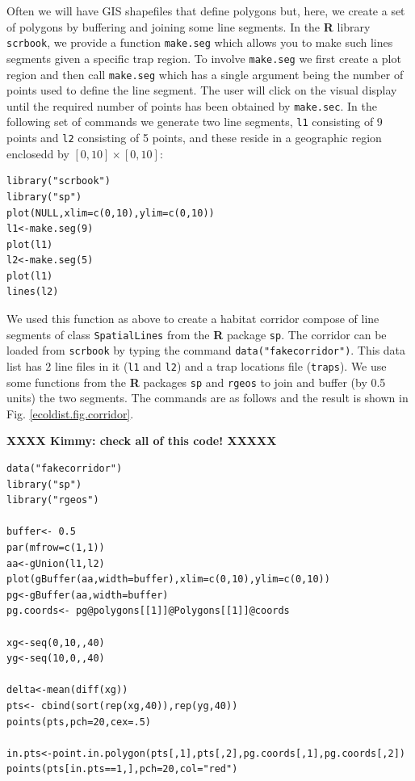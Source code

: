 Often we will have GIS shapefiles that define polygons but, here, we 
 create a set of polygons by
buffering and joining some line segments.
In the {\bf R} library \mbox{\tt scrbook}, we provide
 a function \mbox{\tt make.seg} which allows you to make such
 lines segments given a
specific trap region.  To involve \mbox{\tt make.seg} we first
create a plot region and then call \mbox{\tt make.seg} which has a
single argument being the number of points used to define the line
segment. The user will click on the visual display until the required
number of points has been obtained by \mbox{\tt make.sec}. 
In the following set of commands we generate two line
segments, \mbox{\tt l1} consisting of 9 points and \mbox{\tt l2}
consisting of 5 points, and these reside in a geographic region
enclosedd by $[0,10] \times [0,10]$:
{\small
\begin{verbatim}
library("scrbook")
library("sp")
plot(NULL,xlim=c(0,10),ylim=c(0,10))
l1<-make.seg(9)
plot(l1)
l2<-make.seg(5)
plot(l1)
lines(l2)
\end{verbatim}
}

We used this function as above to create a habitat corridor compose of
line segments of class
\mbox{\tt SpatialLines} from the {\bf R} package \mbox{\tt sp}. The 
corridor can be loaded from \mbox{\tt scrbook} by typing the command
\mbox{\tt data("fakecorridor")}.
This data list has 2 line files in it (\mbox{\tt l1} and \mbox{\tt l2}) and a
trap locations file (\mbox{\tt traps}).
We use some functions from the {\bf R} packages \mbox{\tt sp} and
\mbox{\tt rgeos} to join and
buffer (by 0.5 units) the two segments. The commands are as follows
and the result is shown in Fig. \ref{ecoldist.fig.corridor}.

{\bf XXXX Kimmy: check all of this code! XXXXX}

{\small
\begin{verbatim}
data("fakecorridor")
library("sp")
library("rgeos")

buffer<- 0.5
par(mfrow=c(1,1))
aa<-gUnion(l1,l2)
plot(gBuffer(aa,width=buffer),xlim=c(0,10),ylim=c(0,10))
pg<-gBuffer(aa,width=buffer)
pg.coords<- pg@polygons[[1]]@Polygons[[1]]@coords

xg<-seq(0,10,,40)
yg<-seq(10,0,,40)

delta<-mean(diff(xg))
pts<- cbind(sort(rep(xg,40)),rep(yg,40))
points(pts,pch=20,cex=.5)

in.pts<-point.in.polygon(pts[,1],pts[,2],pg.coords[,1],pg.coords[,2])
points(pts[in.pts==1,],pch=20,col="red")
\end{verbatim}
}

